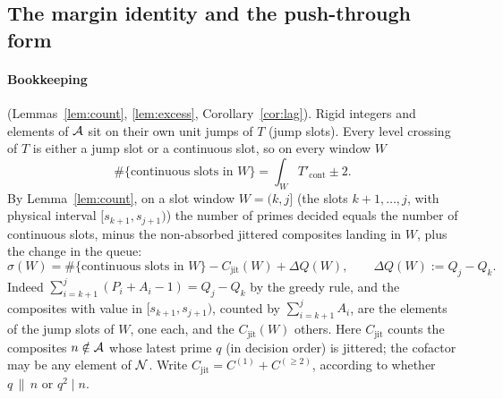 \subsection{The margin identity and the push-through form}\label{sec:noise-identity}

\paragraph{Bookkeeping} (Lemmas~\ref{lem:count}, \ref{lem:excess}, Corollary~\ref{cor:lag}). Rigid integers and
elements of $\mathcal{A}$ sit on their own unit jumps of $T$ (jump slots). Every level crossing of $T$ is either a jump slot or a
continuous slot, so on every window $W$
\[
  \#\{\text{continuous slots in }W\}=\int_WT'_{\mathrm{cont}}\pm2 .
\]
By Lemma~\ref{lem:count}, on a slot window $W=(k,j]$ (the slots $k+1,\dots,j$, with physical interval $[s_{k+1},s_{j+1})$) the
number of primes decided equals the number of continuous slots, minus the non-absorbed jittered composites landing in $W$,
plus the change in the queue:
\begin{equation}\label{eq:bookkeeping}
  \sigma(W)=\#\{\text{continuous slots in }W\}-C_{\mathrm{jit}}(W)+\Delta Q(W),\qquad\Delta Q(W):=Q_j-Q_k .
\end{equation}
Indeed $\sum_{i=k+1}^j(P_i+A_i-1)=Q_j-Q_k$ by the greedy rule, and the composites with value in $[s_{k+1},s_{j+1})$, counted by
$\sum_{i=k+1}^jA_i$, are the elements of the jump slots of $W$, one each, and the $C_{\mathrm{jit}}(W)$ others. Here $C_{\mathrm{jit}}$ counts the composites $n\notin\mathcal{A}$ whose
latest prime $q$ (in decision order) is jittered; the cofactor may be any element of $\mathcal{N}$. Write
$C_{\mathrm{jit}}=C^{(1)}+C^{(\ge2)}$, according to whether $q\,\|\,n$ or $q^2\mid n$.

